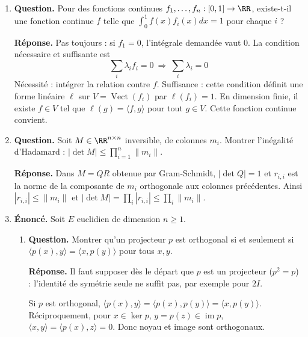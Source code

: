 \documentclass[12pt, a4paper]{article}
\begin{document}
\begin{enumerate}[label=8.\arabic*., start=70]
  \item \begin{minipage}[t]{\linewidth}\raggedright
\textbf{Question.} Pour des fonctions continues $f_1,\ldots,f_n:[0,1]\to\RR$, existe-t-il une fonction continue $f$ telle que $\int_0^1f(x)f_i(x)dx=1$ pour chaque $i$ ?
\par\smallskip
\textbf{Réponse.} Pas toujours : si $f_1=0$, l'intégrale demandée vaut $0$.
    La condition nécessaire et suffisante est
    \[
      \sum_i\lambda_i f_i=0\ \Longrightarrow\ \sum_i\lambda_i=0
    \]
    Nécessité : intégrer la relation contre $f$.
    Suffisance : cette condition définit une forme linéaire $\ell$ sur $V=\operatorname{Vect}(f_i)$ par $\ell(f_i)=1$.
    En dimension finie, il existe $f\in V$ tel que $\ell(g)=\langle f,g\rangle$ pour tout $g\in V$.
    Cette fonction continue convient.
\end{minipage}

  \item \begin{minipage}[t]{\linewidth}\raggedright
\textbf{Question.} Soit $M\in\RR^{n\times n}$ inversible, de colonnes $m_i$. Montrer l’inégalité d’Hadamard : $|\det M|\leq\prod_{i=1}^n\|m_i\|$.
\par\smallskip
\textbf{Réponse.} Dans $M=QR$ obtenue par Gram-Schmidt, $|\det Q|=1$ et
    $r_{i,i}$ est la norme de la composante de $m_i$ orthogonale aux colonnes précédentes.
    Ainsi $|r_{i,i}|\leq\|m_i\|$ et
    $|\det M|=\prod_i|r_{i,i}|\leq\prod_i\|m_i\|$.
\end{minipage}

  \item \begin{minipage}[t]{\linewidth}\raggedright
\textbf{Énoncé.} Soit $E$ euclidien de dimension $n\geq1$.

\begin{enumerate}[\arabic*.]
        \item \textbf{Question.} Montrer qu’un projecteur $p$ est orthogonal si et seulement si $\langle p(x),y\rangle=\langle x,p(y)\rangle$ pour tous $x,y$.
\par\smallskip
\textbf{Réponse.} Il faut supposer dès le départ que $p$ est un projecteur ($p^2=p$) : l'identité de symétrie seule ne suffit pas, par exemple pour $2I$.

Si $p$ est orthogonal, $\langle p(x),y\rangle=\langle p(x),p(y)\rangle=\langle x,p(y)\rangle$.
        Réciproquement, pour $x\in\ker p$, $y=p(z)\in\operatorname{im}p$,
        $\langle x,y\rangle=\langle p(x),z\rangle=0$.
        Donc noyau et image sont orthogonaux.


\end{enumerate}
\end{minipage}
\end{enumerate}
\end{document}
